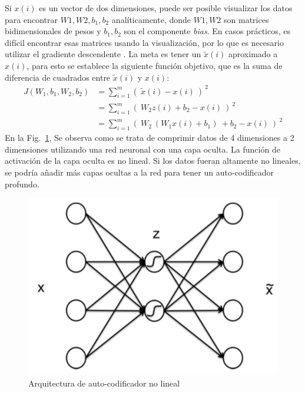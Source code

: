     Si $x(i)$ es un vector de dos dimensiones, puede ser posible visualizar los datos para encontrar $W1, W2, b_1, b_2$ analíticamente, donde $W1, W2$ son matrices bidimensionales de pesos y $b_1, b_2$ son el componente \textit{bias}. En casos prácticos, es difícil encontrar esas matrices usando la visualización, por lo que es necesario utilizar el gradiente descendente \cite{stochastic-gradient-tricks}. La meta es tener un $\tilde{x}(i)$ aproximado a $x(i)$, para esto se establece la siguiente función objetivo, que es la suma de diferencia de cuadrados entre $\tilde{x}(i)$ y $x(i)$:
    \begin{equation}
    \begin{aligned}
     J(W_1,b_1,W_2,b_2) & = \sum_{i=1}^m\left(\ \tilde{x}(i)-x(i)\ \right )^{\ 2} \\
      & = \sum_{i=1}^m\left(\ W_2z(i) + b_2-x(i)\ \right )^{\ 2}\\
     & = \sum_{i=1}^m\left(\ W_2 \ (W_1x(i)+b_1) \ + b_2-x(i)\ \right )^{\ 2}
    \end{aligned}
    \end{equation}
    En la Fig.~\ref{fig:aenco2}, Se observa como se trata de comprimir datos de 4 dimensiones a 2 dimensiones utilizando una red neuronal con una capa oculta. La función de activación de la capa oculta es no lineal. Si los datos fueran altamente no lineales, se podría añadir más capas ocultas a la red para tener un auto-codificador profundo.
    \begin{figure}[htp]
        \centering
        \includegraphics[scale=0.49]{chapter3/aenco2.png}
        \caption{Arquitectura de auto-codificador no lineal}
        \label{fig:aenco2}
    \end{figure}

